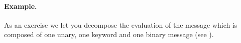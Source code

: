 \documentclass[a4paper,10pt,twoside]{book}
\begin{document}




\paragraph{Example.} As an exercise we let you decompose the evaluation of the message  which is composed of one unary, one keyword and one binary message (see ).

\end{document}
